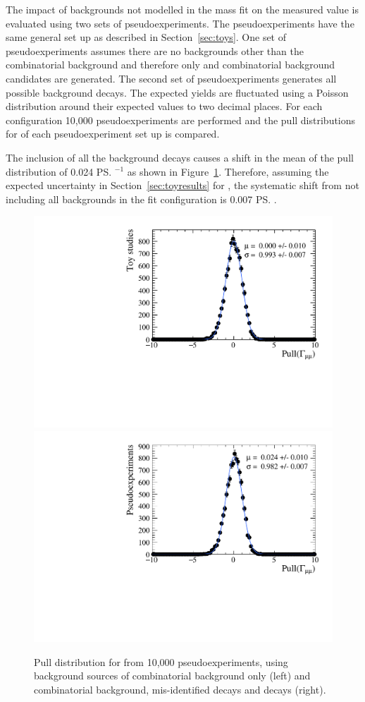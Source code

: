 The impact of backgrounds not modelled in the mass fit on the measured \tmumu value is evaluated using two sets of pseudoexperiments. The pseudoexperiments have the same general set up as described in Section~\ref{sec:toys}. One set of pseudoexperiments assumes there are no backgrounds other than the combinatorial background and therefore only \bsmumu and combinatorial background candidates are generated. The second set of pseudoexperiments generates all possible background decays. The expected yields are fluctuated using a Poisson distribution around their expected values to two decimal places. For each configuration 10,000 pseudoexperiments are performed and the pull distributions for \Gmumu of each pseudoexperiment set up is compared. %

The inclusion of all the background decays causes a shift in the mean of the \Gmumu pull distribution of 0.024 \ps$^{-1}$ as shown in Figure~\ref{fig:bkdcontam}. Therefore, assuming the expected uncertainty in Section~\ref{sec:toyresults} for \tmumu, the systematic shift from not including all backgrounds in the fit configuration is 0.007 \ps.%

\begin{figure}[htbp]
    \centering
        \includegraphics[width=0.49 \textwidth]{./Figs/LifetimeSystematics/Gamma_pull_mass_pdf_Run1.pdf}
        \includegraphics[width=0.49 \textwidth]{./Figs/LifetimeSystematics/5320_all_bkgnds_gamma_pull_CKM.pdf}
    \caption{Pull distribution for \Gmumu from 10,000 pseudoexperiments, using background sources of combinatorial background only (left) and combinatorial background, mis-identified decays and \bdmumu decays (right).}
    \label{fig:bkdcontam}
\end{figure}

